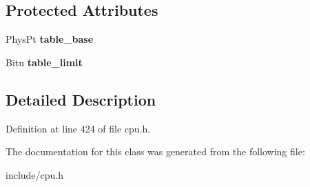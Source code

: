 \subsection*{Protected Attributes}
\begin{DoxyCompactItemize}
\item 
\hypertarget{classDescriptorTable_a98077958af230be31af60525318ee702}{Phys\-Pt {\bfseries table\-\_\-base}}\label{classDescriptorTable_a98077958af230be31af60525318ee702}

\item 
\hypertarget{classDescriptorTable_aee4c9d381d9092de9af52396044bbd72}{Bitu {\bfseries table\-\_\-limit}}\label{classDescriptorTable_aee4c9d381d9092de9af52396044bbd72}

\end{DoxyCompactItemize}


\subsection{Detailed Description}


Definition at line 424 of file cpu.\-h.



The documentation for this class was generated from the following file\-:\begin{DoxyCompactItemize}
\item 
include/cpu.\-h\end{DoxyCompactItemize}

